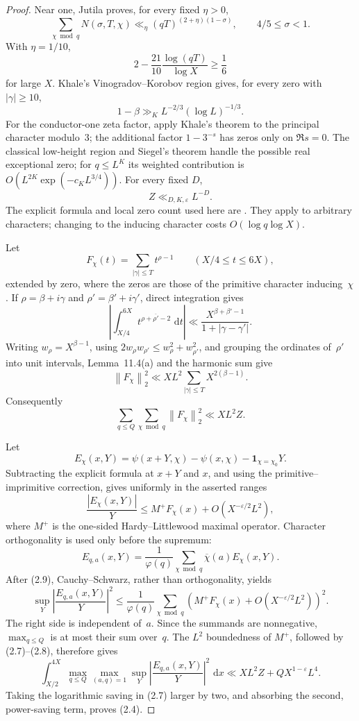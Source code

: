\documentclass[11pt]{article}
\theoremstyle{remark}
\newcommand{\eps}{\varepsilon}
\newcommand{\1}{\mathbf 1}
\newcommand{\dd}{\,\mathrm d}
\newcommand{\norm}[1]{\left\lVert#1\right\rVert}
\begin{document}
\begin{proof}
Near one, Jutila \cite[(1.7)]{Jutila1977} proves, for every fixed $\eta>0$,
\[
 \sum_{\chi\bmod q}N(\sigma,T,\chi)
 \ll_\eta(qT)^{(2+\eta)(1-\sigma)},\qquad4/5\le\sigma<1. \tag{2.6}
\]
With $\eta=1/10$,
\[
 2-\frac{21}{10}\frac{\log(qT)}{\log X}\ge\frac16
\]
for large $X$.  Khale's Vinogradov--Korobov region
\cite[Theorem~1.1]{Khale2024} gives, for every zero with $|\gamma|\ge10$,
\[
 1-\beta\gg_K L^{-2/3}(\log L)^{-1/3}.
\]
For the conductor-one zeta factor, apply Khale's theorem to the principal
character modulo~$3$; the additional factor $1-3^{-s}$ has zeros only on
$\Re s=0$.
The classical low-height region and Siegel's theorem handle the
possible real exceptional zero; for $q\le L^K$ its weighted contribution is
$O(L^{2K}\exp(-c_KL^{3/4}))$.  For every fixed $D$,
\[
 Z\ll_{D,K,\eps}L^{-D}.                                 \tag{2.7}
\]
The explicit formula and local zero count used here are
\cite[Theorem~11.3, Lemma~11.4(a), Theorems~12.3 and 12.10]{Koukoulopoulos}.
They apply to arbitrary characters; changing to the inducing character costs
$O(\log q\log X)$.

Let
\[
 F_\chi(t)=\sum_{|\gamma|\le T}t^{\rho-1}
 \qquad (X/4\le t\le6X),
\]
extended by zero, where the zeros are those of the primitive character
inducing~$\chi$.  If $\rho=\beta+i\gamma$ and
$\rho'=\beta'+i\gamma'$, direct integration gives
\[
 \left|\int_{X/4}^{6X}t^{\rho+\overline{\rho'}-2}\,\dd t\right|
 \ll \frac{X^{\beta+\beta'-1}}{1+|\gamma-\gamma'|}.
\]
Writing $w_\rho=X^{\beta-1}$, using
$2w_\rho w_{\rho'}\le w_\rho^2+w_{\rho'}^2$, and grouping the ordinates
of~$\rho'$ into unit intervals, Lemma~11.4(a) and the harmonic sum give
\[
 \norm{F_\chi}_2^2
 \ll XL^2\sum_{|\gamma|\le T}X^{2(\beta-1)}.
\]
Consequently
\[
 \sum_{q\le Q}\sum_{\chi\bmod q}\norm{F_\chi}_2^2
 \ll XL^2Z.                                             \tag{2.8}
\]

Let
\[
 E_\chi(x,Y)=\psi(x+Y,\chi)-\psi(x,\chi)
              -\mathbf 1_{\chi=\chi_0}Y.
\]
Subtracting the explicit formula at $x+Y$ and $x$, and using the
primitive--imprimitive correction, gives uniformly in the asserted ranges
\[
 \frac{|E_\chi(x,Y)|}{Y}
 \le M^+F_\chi(x)+O(X^{-\eps/2}L^2),                    \tag{2.9}
\]
where $M^+$ is the one-sided Hardy--Littlewood maximal operator.  Character
orthogonality is used only before the supremum:
\[
 E_{q,a}(x,Y)=\frac1{\varphi(q)}
   \sum_{\chi\bmod q}\overline\chi(a)E_\chi(x,Y).
\]
After (2.9), Cauchy--Schwarz, rather than orthogonality, yields
\[
 \sup_Y\left|\frac{E_{q,a}(x,Y)}Y\right|^2
 \le \frac1{\varphi(q)}\sum_{\chi\bmod q}
   \left(M^+F_\chi(x)+O(X^{-\eps/2}L^2)\right)^2.       \tag{2.10}
\]
The right side is independent of~$a$.  Since the summands are nonnegative,
$\max_{q\le Q}$ is at most their sum over~$q$.  The $L^2$ boundedness of
$M^+$, followed by (2.7)--(2.8), therefore gives
\[
 \int_{X/2}^{4X}\max_{q\le Q}\max_{(a,q)=1}\sup_Y
 \left|\frac{E_{q,a}(x,Y)}Y\right|^2\,\dd x
 \ll XL^2Z+QX^{1-\eps}L^4.
\]
Taking the logarithmic saving in (2.7) larger by two, and absorbing the
second, power-saving term, proves (2.4).
\end{proof}
\end{document}

